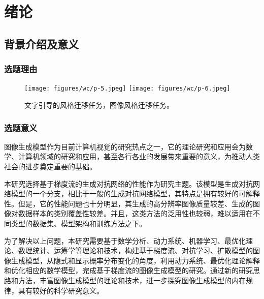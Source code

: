 
\chapter{绪论}
\label{chapter:introduction}


\section{背景介绍及意义}

\subsection{选题理由}\label{liyou}

\begin{figure}[htbp]
    \centering
    \texttt{[image: figures/wc/p-5.jpeg]}
    \hspace{0.1in}
   \texttt{[image: figures/wc/p-6.jpeg]}
    \caption{文字引导的风格迁移任务，图像风格迁移任务。\label{transfer-1}}
\end{figure}

\subsection{选题意义}
图像生成模型作为目前计算机视觉的研究热点之一，它的理论研究和应用会为数学、计算机领域的研究和应用，甚至各行各业的发展带来重要的意义，为推动人类社会的进步奠定重要的基础。


本研究选择基于梯度流的生成对抗网络的性能作为研究主题。该模型是生成对抗网络模型的一个分支，相比于一般的生成对抗网络模型，其特点是拥有较好的可解释性。但是，它的性能问题也十分明显，其生成的高分辨率图像质量较差、生成的图像对数据样本的类别覆盖性较差。并且，这类方法的泛用性也较弱，难以适用在不同类型的数据集、模型架构和训练方法之下。

为了解决以上问题，本研究需要基于数学分析、动力系统、机器学习、最优化理论、数理统计、运筹学等理论和技术，构建基于梯度流、对抗学习、扩散模型的图像生成模型，从隐式和显示概率分布变化的角度，利用动力系统、最优化理论解释和优化相应的数学模型，完成基于梯度流的图像生成模型的研究。通过新的研究思路和方法，丰富图像生成模型的理论和技术，进一步探究图像生成模型的内在规律，具有较好的科学研究意义。

